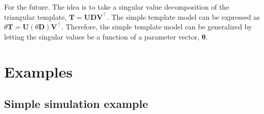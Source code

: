 \documentclass[12pt]{article}\usepackage[]{graphicx}\usepackage[]{color}
\begin{document}
For the future.  The idea is to take a singular value decomposition of
the triangular template, $\bm T = \bm U \bm D \bm V^\top$.  The
simple template model can be expressed as $\theta\bm T = \bm U
(\theta\bm D) \bm V^\top$.  Therefore, the simple template model can be
generalized by letting the singular values be a function of a
parameter vector, $\bm\theta$.

\section{Examples}

\subsection{Simple simulation example}
\end{document}
